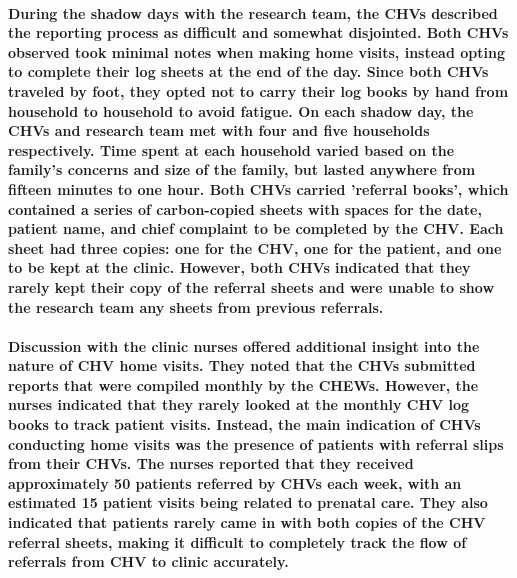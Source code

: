 \paragraph{During the shadow days with the research team, the CHVs described the reporting process as difficult and somewhat disjointed. Both CHVs observed took minimal notes when making home visits, instead opting to complete their log sheets at the end of the day. Since both CHVs traveled by foot, they opted not to carry their log books by hand from household to household to avoid fatigue. On each shadow day, the CHVs and research team met with four and five households respectively. Time spent at each household varied based on the family's concerns and size of the family, but lasted anywhere from fifteen minutes to one hour. Both CHVs carried 'referral books', which contained a series of carbon-copied sheets with spaces for the date, patient name, and chief complaint to be completed by the CHV. Each sheet had three copies: one for the CHV, one for the patient, and one to be kept at the clinic. However, both CHVs indicated that they rarely kept their copy of the referral sheets and were unable to show the research team any sheets from previous referrals.}

\paragraph{Discussion with the clinic nurses offered additional insight into the nature of CHV home visits. They noted that the CHVs submitted reports that were compiled monthly by the CHEWs. However, the nurses indicated that they rarely looked at the monthly CHV log books to track patient visits. Instead, the main indication of CHVs conducting home visits was the presence of patients with referral slips from their CHVs. The nurses reported that they received approximately 50 patients referred by CHVs each week, with an estimated 15 patient visits being related to prenatal care. They also indicated that patients rarely came in with both copies of the CHV referral sheets, making it difficult to completely track the flow of referrals from CHV to clinic accurately.}



